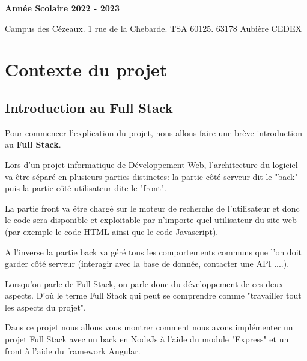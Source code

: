 \documentclass[12pt,french]{article}
\begin{document}
\begin{titlepage}
\begin{minipage}{.45\linewidth}
\begin{flushright}
  			\textbf{Année Scolaire 2022 - 2023}
  		\end{flushright} 
  	\end{minipage}
  	
  	\vspace*{2cm} 
  	
    Campus des Cézeaux. 1 rue de la Chebarde. TSA 60125. 63178 Aubière CEDEX
    	

\end{titlepage}

\restoregeometry



\normalsize\tableofcontents %

\newpage

\section{Contexte du projet}

\subsection{Introduction au Full Stack}

Pour commencer l'explication du projet, nous allons faire une brève introduction au \textbf{Full Stack}.

\medskip

Lors d'un projet informatique de Développement Web, l'architecture du logiciel va être séparé en plusieurs parties distinctes: la partie côté serveur dit le "back" puis la partie côté utilisateur dite le "front".

\medskip

La partie front va être chargé sur le moteur de recherche de l'utilisateur et donc le code sera disponible et exploitable par n'importe quel utilisateur du site web (par exemple le code HTML ainsi que le code Javascript).

\medskip

A l'inverse la partie back va géré tous les comportements communs que l'on doit garder côté serveur (interagir avec la base de donnée, contacter une API ....).

\medskip

Lorsqu'on parle de Full Stack, on parle donc du développement de ces deux aspects. D'où le terme Full Stack qui peut se comprendre comme "travailler tout les aspects du projet".

\medskip

Dans ce projet nous allons vous montrer comment nous avons implémenter un projet Full Stack avec un back en NodeJs à l'aide du module "Express" et un front à l'aide du framework Angular. 
\end{document}
